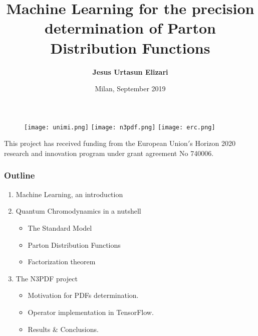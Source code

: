 \documentclass[aspectratio=43]{beamer}
\title[ML for PDFs determination]{Machine Learning for the precision determination of Parton Distribution Functions}
\author{\textbf {Jesus Urtasun Elizari}}
\date{Milan, September 2019}
\begin{document}
\begin{frame}



	\begin{figure}
		\texttt{[image: unimi.png]}
		\hfill
		\texttt{[image: n3pdf.png]}
		\hfill
		\texttt{[image: erc.png]}
		\endminipage
	\end{figure}

	\vspace{1.0 cm}
	{ \tiny This project has received funding from the European Union$'$s Horizon 2020 research and innovation program under grant agreement No 740006.}

\end{frame}

\begin{frame}

	\frametitle{Outline}
	
	\begin{enumerate}
		\item {\color{blue}Machine Learning, an introduction}
		\item {\color{blue}Quantum Chromodynamics in a nutshell}
		\begin{itemize}
			\item The Standard Model
			\item Parton Distribution Functions
			\item Factorization theorem
		\end{itemize}
		\item {\color{blue}The N3PDF project}
		\begin{itemize}
			\item Motivation for PDFs determination.
			\item Operator implementation in TensorFlow.
			\item Results $\&$ Conclusions.
		\end{itemize}
	\end{enumerate}
	
\end{frame}
\end{document}

